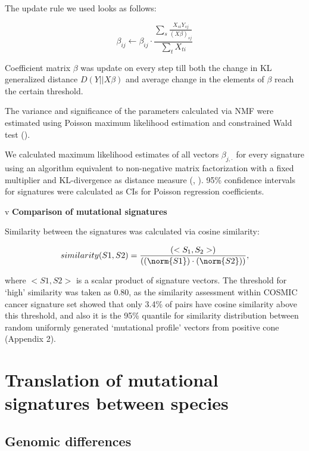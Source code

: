 The update rule we used looks as follows:

\begin{equation}
\beta_{ij} \leftarrow \beta_{ij} \cdot \frac{\sum_s \frac{X_{si} Y_{sj}}{(X\beta)_{sj}}} {\sum_t X_{ti}}
\end{equation}

Coefficient matrix $\beta$ was update on every step till both the change in KL 
generalized distance \(D(Y||X\beta)\) and average change in the elements of $\beta$ 
reach the certain threshold. 

The variance and significance of the parameters calculated via NMF were estimated using 
Poisson maximum likelihood estimation and constrained Wald test (\cite{Molenberghs2007-xo}).

We calculated maximum likelihood estimates of all vectors $\beta_{j,\cdot}$ for every 
signature using an algorithm equivalent to non-negative matrix factorization with a 
fixed multiplier and KL-divergence as distance measure (\cite{Lee1999-at}, \cite{Cemgil2009-mh}). 
95\% confidence intervals for signatures were calculated as CIs for Poisson regression coefficients.

v
\textbf{Comparison of mutational signatures}

Similarity between the signatures was calculated via cosine similarity: 

\[similarity(S1,S2) = \frac{( <S_1, S_2> )}{( (\norm{S1}) \cdot (\norm{S2}) )},\]

where $<S1, S2>$ is a scalar product of signature vectors. The threshold for ‘high’ similarity was taken as 0.80, as the similarity assessment within COSMIC cancer signature set showed that only 3.4\% of pairs have cosine similarity above this threshold, and also it is the 95\% quantile for similarity distribution between random uniformly generated ‘mutational profile’ vectors from positive cone (Appendix 2).


\section{Translation of mutational signatures between species}

\subsection{Genomic differences}

